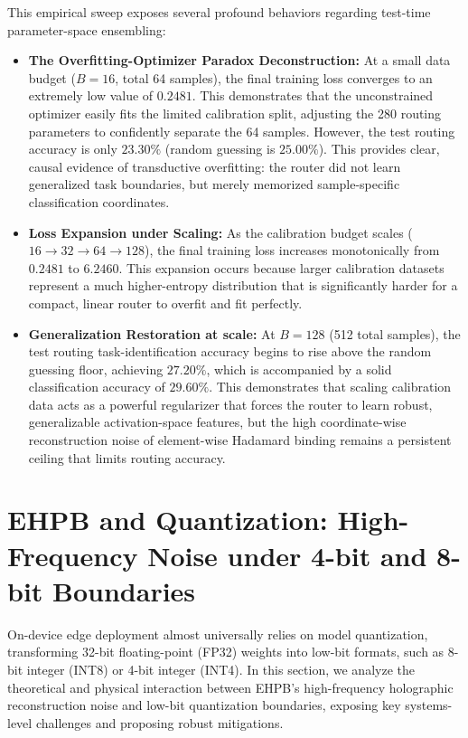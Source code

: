 \documentclass{article}
\theoremstyle{plain}
\theoremstyle{definition}
\theoremstyle{remark}
\begin{document}
This empirical sweep exposes several profound behaviors regarding test-time parameter-space ensembling:
\begin{itemize}
\item \textbf{The Overfitting-Optimizer Paradox Deconstruction:} At a small data budget ($B=16$, total 64 samples), the final training loss converges to an extremely low value of $0.2481$. This demonstrates that the unconstrained optimizer easily fits the limited calibration split, adjusting the 280 routing parameters to confidently separate the 64 samples. However, the test routing accuracy is only $23.30\%$ (random guessing is $25.00\%$). This provides clear, causal evidence of transductive overfitting: the router did not learn generalized task boundaries, but merely memorized sample-specific classification coordinates.
\item \textbf{Loss Expansion under Scaling:} As the calibration budget scales ($16 \to 32 \to 64 \to 128$), the final training loss increases monotonically from $0.2481$ to $6.2460$. This expansion occurs because larger calibration datasets represent a much higher-entropy distribution that is significantly harder for a compact, linear router to overfit and fit perfectly.
\item \textbf{Generalization Restoration at scale:} At $B=128$ (512 total samples), the test routing task-identification accuracy begins to rise above the random guessing floor, achieving $27.20\%$, which is accompanied by a solid classification accuracy of $29.60\%$. This demonstrates that scaling calibration data acts as a powerful regularizer that forces the router to learn robust, generalizable activation-space features, but the high coordinate-wise reconstruction noise of element-wise Hadamard binding remains a persistent ceiling that limits routing accuracy.
\end{itemize}


\section{EHPB and Quantization: High-Frequency Noise under 4-bit and 8-bit Boundaries}
\label{app:quantization_boundaries}

On-device edge deployment almost universally relies on model quantization, transforming 32-bit floating-point (FP32) weights into low-bit formats, such as 8-bit integer (INT8) or 4-bit integer (INT4). In this section, we analyze the theoretical and physical interaction between EHPB's high-frequency holographic reconstruction noise and low-bit quantization boundaries, exposing key systems-level challenges and proposing robust mitigations.
\end{document}
